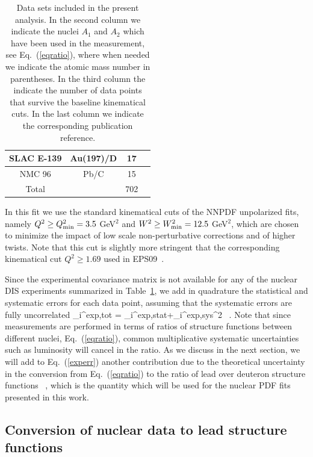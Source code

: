 \begin{table}[t]
\begin{tabular}{c c c c}
\hline
  SLAC E-139 & Au(197)/D & 17 & \cite{PhysRevD.49.4348}\\
\hline
 NMC 96 & Pb/C & 15 & \cite{Arneodo:1996rv}\\
 \hline
 \hline
 Total & & 702 & \\
\hline
\end{tabular}
\caption{\small Data sets included in the present analysis.
  In the second column we indicate the nuclei $A_1$ and $A_2$ which
  have been used in the measurement, see Eq.~(\ref{eqratio}),
  where when needed we indicate the atomic mass
  number in  parentheses.
  In the third column the indicate the number of data points that
  survive the baseline kinematical cuts.
  In the last column we indicate the corresponding publication reference.
}
\label{dataset}
\end{table}


In this fit we use the standard kinematical cuts of the NNPDF unpolarized
fits, namely $Q^2 \ge Q^2_{\rm min}=3.5$ GeV$^2$ and $W^2 \ge W^2_{\rm min}=12.5$
GeV$^2$, which are chosen to minimize the impact of low scale non-perturbative
corrections and of higher twists.
%
Note that this cut is slightly more stringent that the
corresponding kinematical cut $Q^2 \ge 1.69$  used in
EPS09~\cite{Eskola:2009uj}.



Since the experimental covariance matrix is not available for any of
the nuclear DIS experiments summarized in Table~\ref{dataset},
we add in quadrature the statistical and systematic errors for each
data point, assuming that the systematic errors are fully uncorrelated
\be
\label{experr}
\sigma_i^{\rm exp,tot} = \lp \sigma_i^{\rm exp,stat}+\sigma_i^{\rm exp,sys}\rp^2 \, .
\ee
Note that since measurements are performed in terms of ratios of
structure functions between different nuclei, Eq.~(\ref{eqratio}),
common multiplicative systematic uncertainties such as luminosity will
cancel in the ratio.
%
As we discuss in the next section, we will add to
Eq.~(\ref{experr}) another contribution due to the theoretical
uncertainty in the conversion from Eq.~(\ref{eqratio}) to the ratio
of lead over deuteron structure functions
\be
\label{eqratio2}
 \, ,
\ee
which is the quantity which will be used for the nuclear
PDF fits presented in this work.


\subsection{Conversion of nuclear data to lead structure functions}

